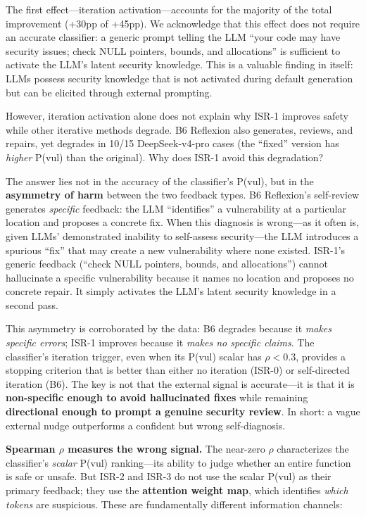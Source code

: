 \documentclass[10pt,conference]{IEEEtran}
\begin{document}
The first effect---iteration activation---accounts for the majority of the total improvement (+30pp of +45pp). We acknowledge that this effect does not require an accurate classifier: a generic prompt telling the LLM ``your code may have security issues; check NULL pointers, bounds, and allocations'' is sufficient to activate the LLM's latent security knowledge. This is a valuable finding in itself: LLMs possess security knowledge that is not activated during default generation but can be elicited through external prompting.

However, iteration activation alone does not explain why ISR-1 improves safety while other iterative methods degrade. B6 Reflexion also generates, reviews, and repairs, yet degrades in 10/15 DeepSeek-v4-pro cases (the ``fixed'' version has \textit{higher} P(vul) than the original). Why does ISR-1 avoid this degradation?

The answer lies not in the accuracy of the classifier's P(vul), but in the \textbf{asymmetry of harm} between the two feedback types. B6 Reflexion's self-review generates \textit{specific} feedback: the LLM ``identifies'' a vulnerability at a particular location and proposes a concrete fix. When this diagnosis is wrong---as it often is, given LLMs' demonstrated inability to self-assess security---the LLM introduces a spurious ``fix'' that may create a new vulnerability where none existed. ISR-1's generic feedback (``check NULL pointers, bounds, and allocations'') cannot hallucinate a specific vulnerability because it names no location and proposes no concrete repair. It simply activates the LLM's latent security knowledge in a second pass.

This asymmetry is corroborated by the data: B6 degrades because it \textit{makes specific errors}; ISR-1 improves because it \textit{makes no specific claims}. The classifier's iteration trigger, even when its P(vul) scalar has $\rho<0.3$, provides a stopping criterion that is better than either no iteration (ISR-0) or self-directed iteration (B6). The key is not that the external signal is accurate---it is that it is \textbf{non-specific enough to avoid hallucinated fixes} while remaining \textbf{directional enough to prompt a genuine security review}. In short: a vague external nudge outperforms a confident but wrong self-diagnosis.

\textbf{Spearman $\rho$ measures the wrong signal.}
The near-zero $\rho$ characterizes the classifier's \textit{scalar} P(vul) ranking---its ability to judge whether an entire function is safe or unsafe. But ISR-2 and ISR-3 do not use the scalar P(vul) as their primary feedback; they use the \textbf{attention weight map}, which identifies \textit{which tokens} are suspicious. These are fundamentally different information channels:
\end{document}
